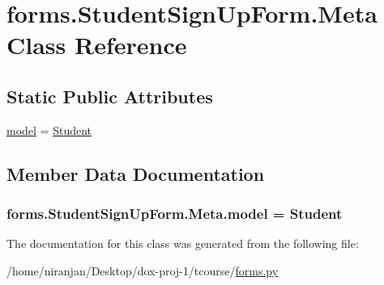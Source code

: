 \hypertarget{classforms_1_1_student_sign_up_form_1_1_meta}{}\section{forms.\+Student\+Sign\+Up\+Form.\+Meta Class Reference}
\label{classforms_1_1_student_sign_up_form_1_1_meta}
\subsection*{Static Public Attributes}
\begin{DoxyCompactItemize}
\item 
\hyperlink{classforms_1_1_student_sign_up_form_1_1_meta_a00d838c6a3612cf9722e781aede71628}{model} = \hyperlink{classmodels_1_1_student}{Student}
\end{DoxyCompactItemize}


\subsection{Member Data Documentation}
\subsubsection[{\texorpdfstring{model}{model}}]{\setlength{\rightskip}{0pt plus 5cm}forms.\+Student\+Sign\+Up\+Form.\+Meta.\+model = {\bf Student}\hspace{0.3cm}{\ttfamily [static]}}\hypertarget{classforms_1_1_student_sign_up_form_1_1_meta_a00d838c6a3612cf9722e781aede71628}{}\label{classforms_1_1_student_sign_up_form_1_1_meta_a00d838c6a3612cf9722e781aede71628}


The documentation for this class was generated from the following file\+:\begin{DoxyCompactItemize}
\item 
/home/niranjan/\+Desktop/dox-\/proj-\/1/tcourse/\hyperlink{forms_8py}{forms.\+py}\end{DoxyCompactItemize}
